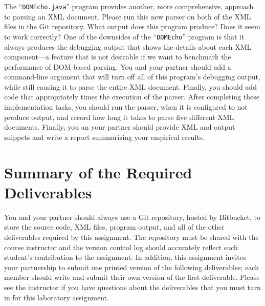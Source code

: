 The ``{\tt DOMEcho.java}'' program provides another, more comprehensive, approach to parsing an XML document. Please run
this new parser on both of the XML files in the Git repository. What output does this program produce? Does it seem to
work correctly? One of the downsides of the ``{\tt DOMEcho}'' program is that it always produces the debugging output
that shows the details about each XML component---a feature that is not desirable if we want to benchmark the
performance of DOM-based parsing. You and your partner should add a command-line argument that will turn off all of this
program's debugging output, while still causing it to parse the entire XML document. Finally, you should add code that
appropriately times the execution of the parser. After completing these implementation tasks, you should run the parser,
when it is configured to not produce output, and record how long it takes to parse five different XML documents.
Finally, you an your partner should provide XML and output snippets and write a report summarizing your empirical
results.

\section*{Summary of the Required Deliverables}

You and your partner should always use a Git repository, hosted by Bitbucket, to store the source code, XML files,
program output, and all of the other deliverables required by this assignment. The repository must be shared with the
course instructor and the version control log should accurately reflect each student's contribution to the assignment.
In addition, this assignment invites your partnership to submit one printed version of the following deliverables; each
member should write and submit their own version of the first deliverable. Please see the instructor if you have
questions about the deliverables that you must turn in for this laboratory assignment.

